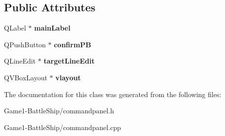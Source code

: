 \subsection*{Public Attributes}
\begin{DoxyCompactItemize}
\item 
\mbox{\label{classcommandPanel_ae1efb014f348de12388614e3b6300863}} 
Q\+Label $\ast$ {\bfseries main\+Label}
\item 
\mbox{\label{classcommandPanel_ad3af6fe471db6a90d28c1068ce297612}} 
Q\+Push\+Button $\ast$ {\bfseries confirm\+PB}
\item 
\mbox{\label{classcommandPanel_a7239e7c07e2ce78eaf1a4c9c2325786a}} 
Q\+Line\+Edit $\ast$ {\bfseries target\+Line\+Edit}
\item 
\mbox{\label{classcommandPanel_aa765db215f7f30777ee623b54aae37c3}} 
Q\+V\+Box\+Layout $\ast$ {\bfseries vlayout}
\end{DoxyCompactItemize}


The documentation for this class was generated from the following files\+:\begin{DoxyCompactItemize}
\item 
Game1-\/\+Battle\+Ship/commandpanel.\+h\item 
Game1-\/\+Battle\+Ship/commandpanel.\+cpp\end{DoxyCompactItemize}
